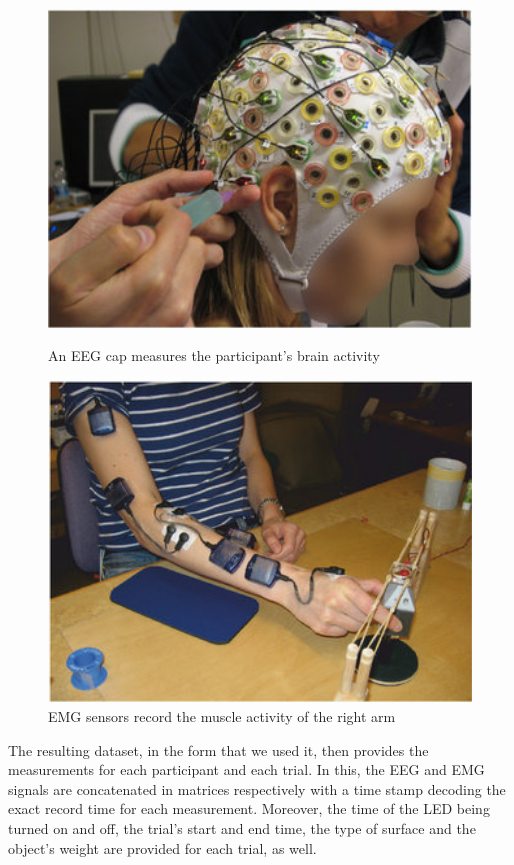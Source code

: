 \documentclass{article} %
\begin{document}
\begin{figure}
	\centering
	\begin{minipage}{0.5\textwidth}
		\centering
		\includegraphics[width=1.0\textwidth]{images/eeg_setup.jpg}
		\caption{An EEG cap measures the participant's brain activity \cite{nature}}
		\label{fig:eeg_setup}
	\end{minipage}\hfill
	\begin{minipage}{0.49\textwidth}
		\centering
		\includegraphics[width=1.0\textwidth]{images/emg_setup.jpg}
		\caption{EMG sensors record the muscle activity of the right arm \cite{nature}}
		\label{fig:emg_setup}
	\end{minipage}
\end{figure}
The resulting dataset, in the form that we used it, then provides the measurements for each participant and each trial. In this, the EEG and EMG signals are concatenated in matrices respectively with a time stamp decoding the exact record time for each measurement. Moreover, the time of the LED being turned on and off, the trial's start and end time, the type of surface and the object's weight are provided for each trial, as well. \cite{nature}
\end{document}

